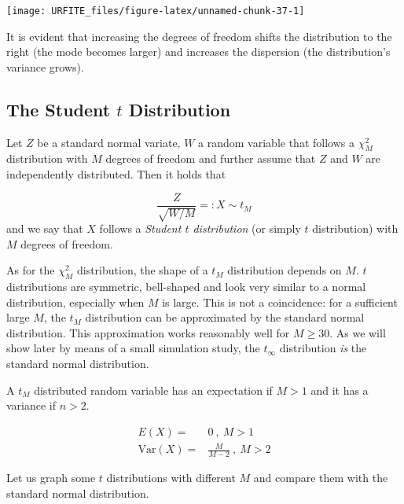 \documentclass[]{book}
\theoremstyle{definition}
\theoremstyle{definition}
\theoremstyle{definition}
\theoremstyle{remark}
\begin{document}
\begin{center}\texttt{[image: URFITE\_files/figure-latex/unnamed-chunk-37-1]} \end{center}

It is evident that increasing the degrees of freedom shifts the
distribution to the right (the mode becomes larger) and increases the
dispersion (the distribution's variance grows).

\hypertarget{thetdist}{\subsection*{\texorpdfstring{The Student \(t\)
Distribution}{The Student t Distribution}}\label{thetdist}}

Let \(Z\) be a standard normal variate, \(W\) a random variable that
follows a \(\chi^2_M\) distribution with \(M\) degrees of freedom and
further assume that \(Z\) and \(W\) are independently distributed. Then
it holds that

\[ \frac{Z}{\sqrt{W/M}} =:X \sim t_M \] and we say that \(X\) follows a
\emph{Student \(t\) distribution} (or simply \(t\) distribution) with
\(M\) degrees of freedom.

As for the \(\chi^2_M\) distribution, the shape of a \(t_M\)
distribution depends on \(M\). \(t\) distributions are symmetric,
bell-shaped and look very similar to a normal distribution, especially
when \(M\) is large. This is not a coincidence: for a sufficient large
\(M\), the \(t_M\) distribution can be approximated by the standard
normal distribution. This approximation works reasonably well for
\(M\geq 30\). As we will show later by means of a small simulation
study, the \(t_{\infty}\) distribution \emph{is} the standard normal
distribution.

A \(t_M\) distributed random variable has an expectation if \(M>1\) and
it has a variance if \(n>2\).

\begin{align}
  E(X) =& 0 \ , \ M>1 \\
  \text{Var}(X) =& \frac{M}{M-2} \ , \ M>2
\end{align}

Let us graph some \(t\) distributions with different \(M\) and compare
them with the standard normal distribution.
\end{document}
